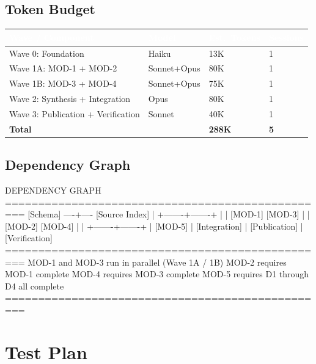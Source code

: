 \documentclass[11pt,letterpaper]{article}
\newcommand{\tableheader}[1]{\textbf{\sffamily\textcolor{white}{#1}}}
\begin{document}
\subsection{Token Budget}

\begin{center}
\begin{tabularx}{\textwidth}{L{4.5cm}C{2cm}C{2.5cm}C{2cm}}
\toprule
{}
\tableheader{Wave / Component} & \tableheader{Model} & \tableheader{Est.\ Tokens} & \tableheader{Sessions} \\
\midrule
Wave 0: Foundation & Haiku & 13K & 1 \\
Wave 1A: MOD-1 + MOD-2 & Sonnet+Opus & 80K & 1 \\
Wave 1B: MOD-3 + MOD-4 & Sonnet+Opus & 75K & 1 \\
Wave 2: Synthesis + Integration & Opus & 80K & 1 \\
Wave 3: Publication + Verification & Sonnet & 40K & 1 \\
\midrule
\textbf{Total} & & \textbf{288K} & \textbf{5} \\
\bottomrule
\end{tabularx}
\end{center}

\subsection{Dependency Graph}

\begin{asciibox}
DEPENDENCY GRAPH
=================================================
  [Schema] ----+---- [Source Index]
               |
       +-------+-------+
       |               |
   [MOD-1]         [MOD-3]
       |               |
   [MOD-2]         [MOD-4]
       |               |
       +-------+-------+
               |
           [MOD-5]
               |
        [Integration]
               |
        [Publication]
               |
        [Verification]
=================================================
MOD-1 and MOD-3 run in parallel (Wave 1A / 1B)
MOD-2 requires MOD-1 complete
MOD-4 requires MOD-3 complete
MOD-5 requires D1 through D4 all complete
=================================================
\end{asciibox}

\section{Test Plan}
\end{document}
